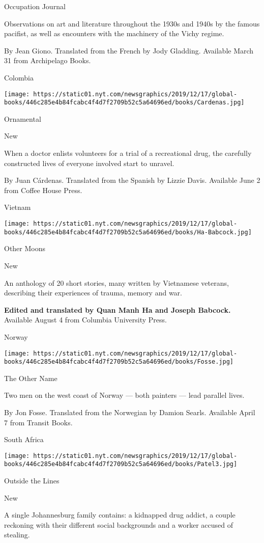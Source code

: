 Occupation Journal

Observations on art and literature throughout the 1930s and 1940s by the
famous pacifist, as well as encounters with the machinery of the Vichy
regime.

 By Jean Giono. Translated from the French by Jody Gladding. Available
March 31 from Archipelago Books.

Colombia

\texttt{[image: https://static01.nyt.com/newsgraphics/2019/12/17/global-books/446c285e4b84fcabc4f4d7f2709b52c5a64696ed/books/Cardenas.jpg]}

Ornamental

New

When a doctor enlists volunteers for a trial of a recreational drug, the
carefully constructed lives of everyone involved start to unravel.

 By Juan Cárdenas. Translated from the Spanish by Lizzie Davis.
Available June 2 from Coffee House Press.

Vietnam

\texttt{[image: https://static01.nyt.com/newsgraphics/2019/12/17/global-books/446c285e4b84fcabc4f4d7f2709b52c5a64696ed/books/Ha-Babcock.jpg]}

Other Moons

New

An anthology of 20 short stories, many written by Vietnamese veterans,
describing their experiences of trauma, memory and war.

 \textbf{Edited and translated by Quan Manh Ha and Joseph Babcock.}
Available August 4 from Columbia University Press.

Norway

\texttt{[image: https://static01.nyt.com/newsgraphics/2019/12/17/global-books/446c285e4b84fcabc4f4d7f2709b52c5a64696ed/books/Fosse.jpg]}

The Other Name

Two men on the west coast of Norway --- both painters --- lead parallel
lives.

 By Jon Fosse. Translated from the Norwegian by Damion Searls. Available
April 7 from Transit Books.

South Africa

\texttt{[image: https://static01.nyt.com/newsgraphics/2019/12/17/global-books/446c285e4b84fcabc4f4d7f2709b52c5a64696ed/books/Patel3.jpg]}

Outside the Lines

New

A single Johannesburg family contains: a kidnapped drug addict, a couple
reckoning with their different social backgrounds and a worker accused
of stealing.

